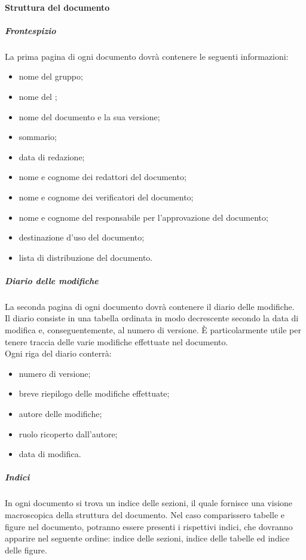 	\paragraph{Struttura del documento}
	\label{sec:3.1.2.4}
		\subparagraph{Frontespizio}
		\label{sec:3.1.2.4.1}
			La prima pagina di ogni documento dovrà contenere le seguenti informazioni:
			\begin{itemize}
				\item nome del gruppo;
				\item nome del ;
				\item nome del documento e la sua versione;
				\item sommario;
				\item data di redazione;
				\item nome e cognome dei redattori del documento;
				\item nome e cognome dei verificatori del documento;
				\item nome e cognome del responsabile per l'approvazione del documento;
				\item destinazione d'uso del documento;
				\item lista di distribuzione del documento.
			\end{itemize}
		\subparagraph{Diario delle modifiche}
		\label{sec:3.1.2.4.2}
			La seconda pagina di ogni documento dovrà contenere il diario delle modifiche.\\
			Il diario consiste in una tabella ordinata in modo decrescente secondo la data di modifica e, conseguentemente, al numero di versione. È particolarmente utile per tenere traccia delle varie modifiche effettuate nel documento. \\
			Ogni riga del diario conterrà:
			\begin{itemize}
				\item numero di versione;
				\item breve riepilogo delle modifiche effettuate;
				\item autore delle modifiche;
				\item ruolo ricoperto dall'autore;
				\item data di modifica.
			\end{itemize}		
		\subparagraph{Indici}
		\label{sec:3.1.2.4.3}
			In ogni documento si trova un indice delle sezioni, il quale fornisce una visione macroscopica della struttura del documento. Nel caso comparissero tabelle e figure nel documento, potranno essere presenti i rispettivi indici, che dovranno apparire nel seguente ordine: indice delle sezioni, indice delle tabelle ed indice delle figure.
